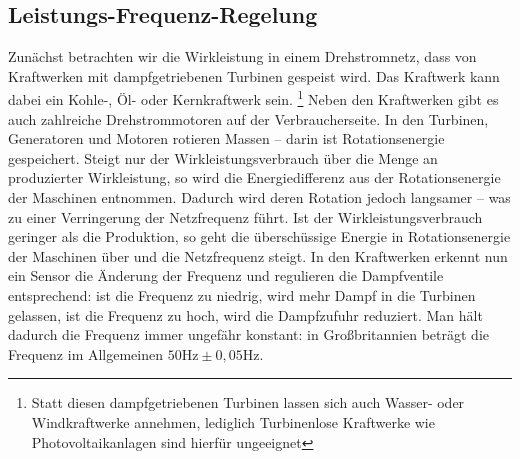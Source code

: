 \documentclass[10pt,a4paper]{article}
\newcommand{\q}{\glqq }
\begin{document}
\subsection{Leistungs-Frequenz-Regelung}
Zunächst betrachten wir die Wirkleistung in einem Drehstromnetz, dass von Kraftwerken mit dampfgetriebenen Turbinen gespeist wird. Das Kraftwerk kann dabei ein Kohle-, Öl- oder Kernkraftwerk sein. \footnote{Statt diesen dampfgetriebenen Turbinen lassen sich auch Wasser- oder Windkraftwerke annehmen, lediglich Turbinenlose Kraftwerke wie Photovoltaikanlagen sind hierfür ungeeignet} %
Neben den Kraftwerken gibt es auch zahlreiche Drehstrommotoren auf der \q Verbraucherseite\q. %
In den Turbinen, Generatoren und Motoren rotieren Massen – darin ist Rotationsenergie gespeichert.
Steigt nur der Wirkleistungsverbrauch über die Menge an produzierter Wirkleistung, so wird die Energiedifferenz aus der Rotationsenergie der Maschinen entnommen.\cite{Harrison}
Dadurch wird deren Rotation jedoch langsamer – was zu einer Verringerung der Netzfrequenz führt.
Ist der Wirkleistungsverbrauch geringer als die Produktion, so geht die überschüssige Energie in Rotationsenergie der Maschinen über und die Netzfrequenz steigt.
In den Kraftwerken erkennt nun ein Sensor die Änderung der Frequenz und regulieren die Dampfventile entsprechend:
ist die Frequenz zu niedrig, wird mehr Dampf in die Turbinen gelassen, ist die Frequenz zu hoch, wird die Dampfzufuhr reduziert.
Man hält dadurch die Frequenz immer ungefähr konstant: in Großbritannien beträgt die Frequenz im Allgemeinen $50 \mathrm{Hz} \pm 0,05 \mathrm{Hz}$.\cite{Harrison} %
\end{document}
